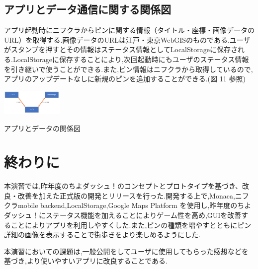 \documentclass[a4paper, twoside]{jarticle}
\makeatletter
\newenvironment{figurehere}
  {\def\@captype{figure}}
  {}
\makeatother
\begin{document}
\begin{multicols}{2}
\subsection{アプリとデータ通信に関する関係図}
アプリ起動時にニフクラからピンに関する情報（タイトル・座標・画像データのURL）を取得する.画像データのURLは江戸・東京WebGISのものである.ユーザがスタンプを押すとその情報はステータス情報としてLocalStorageに保存される.LocalStorageに保存することにより,次回起動時にもユーザのステータス情報を引き継いで使うことができる.また,ピン情報はニフクラから取得しているので,アプリのアップデートなしに新規のピンを追加することができる.(図 11 参照)
\begin{figurehere}
\begin{center}
\includegraphics[bb=30 100 550 500,width=3cm]{./image12.png}%
\end{center}
\caption{アプリとデータの関係図}\label{fig:12}
\end{figurehere}


\section{終わりに}
本演習では,昨年度のちよダッシュ！のコンセプトとプロトタイプを基づき、改良・改善を加えた正式版の開発とリリースを行った.開発する上で,Monaca,ニフクラmobile backend,LocalStorage,Google Maps Platform を使用し,昨年度のちよダッシュ！にステータス機能を加えることによりゲーム性を高め,GUIを改善することによりアプリを利用しやすくした.また,ピンの種類を増やすとともにピン詳細の画像を表示することで街歩きをより楽しめるようにした.\par
本演習においての課題は,一般公開をしてユーザに使用してもらった感想などを基づき,より使いやすいアプリに改良することである.



\end{multicols} %
\vspace{1cm}
\end{document}
